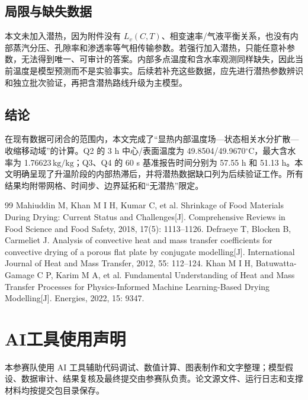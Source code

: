\documentclass[withoutpreface,bwprint]{cumcmthesis}
\newcommand{\kgkg}{\ensuremath{\mathrm{kg/kg}}}
\begin{document}
\subsection{局限与缺失数据}
本文未加入潜热，因为附件没有 $L_v(C,T)$、相变速率/气液平衡关系，也没有内部蒸汽分压、孔隙率和渗透率等气相传输参数。若强行加入潜热，只能任意补参数，无法得到唯一、可审计的答案。内部多点温度和含水率观测同样缺失，因此当前温度是模型预测而不是实验事实。后续若补充这些数据，应先进行潜热参数辨识和独立批次验证，再把含潜热路线升级为主模型。

\subsection{结论}
在现有数据可闭合的范围内，本文完成了“显热内部温度场—状态相关水分扩散—收缩移动域”的计算。Q2 的 3 h 中心/表面温度为 49.8504/49.9670\(^{\circ}\mathrm C\)，最大含水率为 1.76623\,\kgkg；Q3、Q4 的 60 s 基准报告时间分别为 57.55 h 和 51.13 h。本文明确呈现了升温阶段的内部热滞后，并将潜热数据缺口列为后续验证工作。所有结果均附带网格、时间步、边界延拓和“无潜热”限定。

\begin{thebibliography}{99}
 Mahiuddin M, Khan M I H, Kumar C, et al. Shrinkage of Food Materials During Drying: Current Status and Challenges[J]. Comprehensive Reviews in Food Science and Food Safety, 2018, 17(5): 1113--1126.
 Defraeye T, Blocken B, Carmeliet J. Analysis of convective heat and mass transfer coefficients for convective drying of a porous flat plate by conjugate modelling[J]. International Journal of Heat and Mass Transfer, 2012, 55: 112--124.
 Khan M I H, Batuwatta-Gamage C P, Karim M A, et al. Fundamental Understanding of Heat and Mass Transfer Processes for Physics-Informed Machine Learning-Based Drying Modelling[J]. Energies, 2022, 15: 9347.
\end{thebibliography}

\section*{AI工具使用声明}
本参赛队使用 AI 工具辅助代码调试、数值计算、图表制作和文字整理；模型假设、数据审计、结果复核及最终提交由参赛队负责。论文源文件、运行日志和支撑材料均按提交包目录保存。
\end{document}
